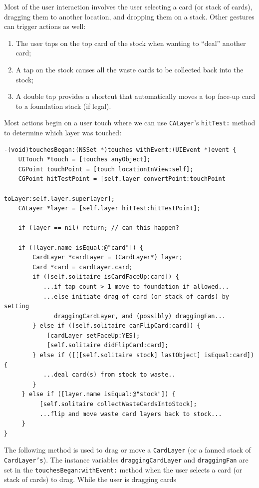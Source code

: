\documentclass[11pt]{article}
\begin{document}
Most of the user interaction involves the user selecting a card (or stack
of cards), dragging them to another location, and dropping them on
a stack. Other gestures can trigger actions as well:
\begin{enumerate}
\item The user taps on the top card of the stock when wanting to
  ``deal'' another card;
\item A tap on the stock causes all the waste cards to be collected
  back into the stock;
\item A double tap provides a shortcut that automatically moves a
  top face-up card to a foundation stack (if legal).
\end{enumerate}
Most actions begin on a user touch where we can use 
{\tt CALayer}'s {\tt hitTest:} method to determine which layer was touched:
\begin{verbatim}
-(void)touchesBegan:(NSSet *)touches withEvent:(UIEvent *)event {
    UITouch *touch = [touches anyObject];
    CGPoint touchPoint = [touch locationInView:self];
    CGPoint hitTestPoint = [self.layer convertPoint:touchPoint 
                                            toLayer:self.layer.superlayer];
    CALayer *layer = [self.layer hitTest:hitTestPoint];

    if (layer == nil) return; // can this happen?

    if ([layer.name isEqual:@"card"]) {
        CardLayer *cardLayer = (CardLayer*) layer;
        Card *card = cardLayer.card;
        if ([self.solitaire isCardFaceUp:card]) {
           ...if tap count > 1 move to foundation if allowed...
           ...else initiate drag of card (or stack of cards) by setting
              draggingCardLayer, and (possibly) draggingFan...
        } else if ([self.solitaire canFlipCard:card]) {
            [cardLayer setFaceUp:YES];
            [self.solitaire didFlipCard:card];
        } else if ([[[self.solitaire stock] lastObject] isEqual:card]) {        
           ...deal card(s) from stock to waste..
        }
     } else if ([layer.name isEqual:@"stock"]) {
          [self.solitaire collectWasteCardsIntoStock];
          ...flip and move waste card layers back to stock...
     }
}
\end{verbatim}
The following method is used to drag or move a {\tt CardLayer} (or a fanned stack of
{\tt CardLayer's}). The instance variables
{\tt draggingCardLayer} and {\tt draggingFan} are set
in the {\tt touchesBegan:withEvent:} method when the user selects
a card (or stack of cards) to drag.
While the user is dragging cards 
\end{document}
